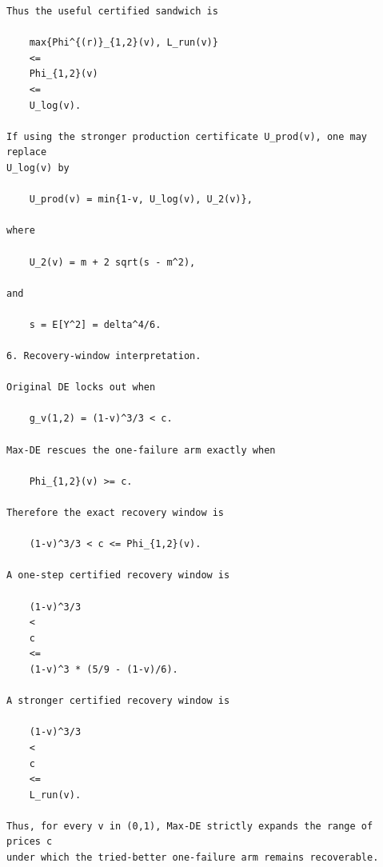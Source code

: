 \begin{small}
\begin{verbatim}
Thus the useful certified sandwich is

    max{Phi^{(r)}_{1,2}(v), L_run(v)}
    <=
    Phi_{1,2}(v)
    <=
    U_log(v).

If using the stronger production certificate U_prod(v), one may replace
U_log(v) by

    U_prod(v) = min{1-v, U_log(v), U_2(v)},

where

    U_2(v) = m + 2 sqrt(s - m^2),

and

    s = E[Y^2] = delta^4/6.

6. Recovery-window interpretation.

Original DE locks out when

    g_v(1,2) = (1-v)^3/3 < c.

Max-DE rescues the one-failure arm exactly when

    Phi_{1,2}(v) >= c.

Therefore the exact recovery window is

    (1-v)^3/3 < c <= Phi_{1,2}(v).

A one-step certified recovery window is

    (1-v)^3/3
    <
    c
    <=
    (1-v)^3 * (5/9 - (1-v)/6).

A stronger certified recovery window is

    (1-v)^3/3
    <
    c
    <=
    L_run(v).

Thus, for every v in (0,1), Max-DE strictly expands the range of prices c
under which the tried-better one-failure arm remains recoverable.
\end{verbatim}
\end{small}
